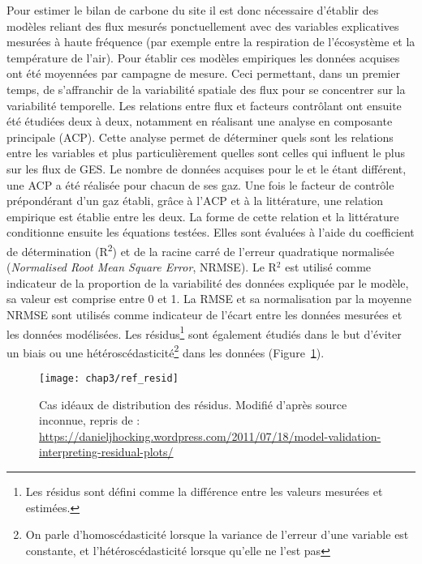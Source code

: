 Pour estimer le bilan de carbone du site il est donc nécessaire d'établir des modèles reliant des flux mesurés ponctuellement avec des variables explicatives mesurées à haute fréquence (par exemple entre la respiration de l'écosystème et la température de l'air).
Pour établir ces modèles empiriques les données acquises ont été moyennées par campagne de mesure.
Ceci permettant, dans un premier temps, de s'affranchir de la variabilité spatiale des flux pour se concentrer sur la variabilité temporelle.
Les relations entre flux et facteurs contrôlant ont ensuite été étudiées deux à deux, notamment en réalisant une analyse en composante principale (ACP).
Cette analyse permet de déterminer quels sont les relations entre les variables et plus particulièrement quelles sont celles qui influent le plus sur les flux de GES.
Le nombre de données acquises pour le \coo et le \chh étant différent, une ACP a été réalisée pour chacun de ses gaz.
Une fois le facteur de contrôle prépondérant d'un gaz établi, grâce à l'ACP et à la littérature, une relation empirique est établie entre les deux.
La forme de cette relation et la littérature conditionne ensuite les équations testées.
Elles sont évaluées à l'aide du coefficient de détermination (R\textsuperscript{2}) et de la racine carré de l'erreur quadratique normalisée (\textit{Normalised Root Mean Square Error}, NRMSE).
Le R$^{2}$ est utilisé comme indicateur de la proportion de la variabilité des données expliquée par le modèle, sa valeur est comprise entre 0 et 1.
La RMSE et sa normalisation par la moyenne NRMSE sont utilisés comme indicateur de l'écart entre les données mesurées et les données modélisées.
Les résidus\footnote{Les résidus sont défini comme la différence entre les valeurs mesurées et estimées.} sont également étudiés dans le but d'éviter un biais ou une hétéroscédasticité\footnote{On parle d'homoscédasticité lorsque la variance de l'erreur d'une variable est constante, et l'hétéroscédasticité lorsque qu'elle ne l'est pas} dans les données (Figure~\ref{fig:ref_resid}).

\begin{figure}
\centering
\texttt{[image: chap3/ref\_resid]}
\caption{Cas idéaux de distribution des résidus. Modifié d'après source inconnue, repris de : \url{https://danieljhocking.wordpress.com/2011/07/18/model-validation-interpreting-residual-plots/}}
\label{fig:ref_resid}
\end{figure}

